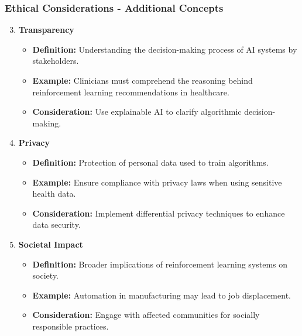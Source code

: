 \documentclass[aspectratio=169]{beamer}
\begin{document}
\begin{frame}[fragile]
    \frametitle{Ethical Considerations - Additional Concepts}
    \begin{enumerate}\setcounter{enumi}{2}
        \item \textbf{Transparency}
        \begin{itemize}
            \item \textbf{Definition:} Understanding the decision-making process of AI systems by stakeholders.
            \item \textbf{Example:} Clinicians must comprehend the reasoning behind reinforcement learning recommendations in healthcare.
            \item \textbf{Consideration:} Use explainable AI to clarify algorithmic decision-making.
        \end{itemize}
        
        \item \textbf{Privacy}
        \begin{itemize}
            \item \textbf{Definition:} Protection of personal data used to train algorithms.
            \item \textbf{Example:} Ensure compliance with privacy laws when using sensitive health data.
            \item \textbf{Consideration:} Implement differential privacy techniques to enhance data security.
        \end{itemize}

        \item \textbf{Societal Impact}
        \begin{itemize}
            \item \textbf{Definition:} Broader implications of reinforcement learning systems on society.
            \item \textbf{Example:} Automation in manufacturing may lead to job displacement.
            \item \textbf{Consideration:} Engage with affected communities for socially responsible practices.
        \end{itemize}
    \end{enumerate}
\end{frame}
\end{document}
